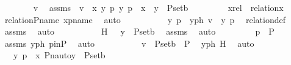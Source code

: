 \begin{isabellebody}
\ \ \ \ \ \ \isamarkupfalse%
\ v\ \isamarkupfalse%
\ assms\ {\isacharcolon}{\kern0pt}\ {\isachardoublequoteopen}v\ {\isasymin}\ x{\isachardoublequoteclose}\ {\isachardoublequoteopen}{\isacharparenleft}{\kern0pt}{\isasymAnd}y\ p{\isachardot}{\kern0pt}\ {\isasymlangle}y{\isacharcomma}{\kern0pt}\ p{\isasymrangle}\ {\isasymin}\ x\ {\isasymLongrightarrow}\ y\ {\isasymin}\ P{\isacharunderscore}{\kern0pt}set{\isacharparenleft}{\kern0pt}b{\isacharparenright}{\kern0pt}{\isacharparenright}{\kern0pt}{\isachardoublequoteclose}\ \isanewline
\ \ \ \ \ \ \isamarkupfalse%
\ xrel\ {\isacharcolon}{\kern0pt}\ {\isachardoublequoteopen}relation{\isacharparenleft}{\kern0pt}x{\isacharparenright}{\kern0pt}{\isachardoublequoteclose}\ \isamarkupfalse%
\ relation{\isacharunderscore}{\kern0pt}P{\isacharunderscore}{\kern0pt}name\ xpname\ \isamarkupfalse%
\ auto\ \isanewline
\ \ \ \ \ \ \isamarkupfalse%
\ \isamarkupfalse%
\ y\ p\ \ yph{\isacharcolon}{\kern0pt}\ {\isachardoublequoteopen}v\ {\isacharequal}{\kern0pt}\ {\isacharless}{\kern0pt}y{\isacharcomma}{\kern0pt}\ p{\isachargreater}{\kern0pt}{\isachardoublequoteclose}\ \isamarkupfalse%
\ relation{\isacharunderscore}{\kern0pt}def\ \isamarkupfalse%
\ assms\ \isamarkupfalse%
\ auto\ \isanewline
\ \ \ \ \ \ \isamarkupfalse%
\ \isamarkupfalse%
\ H\ {\isacharcolon}{\kern0pt}\ {\isachardoublequoteopen}\ y\ {\isasymin}\ P{\isacharunderscore}{\kern0pt}set{\isacharparenleft}{\kern0pt}b{\isacharparenright}{\kern0pt}{\isachardoublequoteclose}\ \isamarkupfalse%
\ assms\ \isamarkupfalse%
\ auto\ \isanewline
\ \ \ \ \ \ \isamarkupfalse%
\ {\isachardoublequoteopen}p\ {\isasymin}\ P{\isachardoublequoteclose}\ \isamarkupfalse%
\ assms\ yph\ pinP\ \isamarkupfalse%
\ auto\ \isanewline
\ \ \ \ \ \ \isamarkupfalse%
\ \isamarkupfalse%
\ {\isachardoublequoteopen}v\ {\isasymin}\ P{\isacharunderscore}{\kern0pt}set{\isacharparenleft}{\kern0pt}b{\isacharparenright}{\kern0pt}\ {\isasymtimes}\ P{\isachardoublequoteclose}\ \isamarkupfalse%
\ yph\ H\ \isamarkupfalse%
\ auto\ \isanewline
\ \ \ \ \isamarkupfalse%
\isanewline
\ \ \ \ \isamarkupfalse%
\ \isamarkupfalse%
\ {\isachardoublequoteopen}{\isachardot}{\kern0pt}{\isachardot}{\kern0pt}{\isachardot}{\kern0pt}\ {\isasymlongleftrightarrow}\ {\isacharparenleft}{\kern0pt}{\isasymforall}{\isacharless}{\kern0pt}y{\isacharcomma}{\kern0pt}\ p{\isachargreater}{\kern0pt}\ {\isasymin}\ x{\isachardot}{\kern0pt}\ Pn{\isacharunderscore}{\kern0pt}auto{\isacharparenleft}{\kern0pt}{\isasympi}{\isacharparenright}{\kern0pt}{\isacharbackquote}{\kern0pt}y\ {\isasymin}\ P{\isacharunderscore}{\kern0pt}set{\isacharparenleft}{\kern0pt}b{\isacharparenright}{\kern0pt}{\isacharparenright}{\kern0pt}{\isachardoublequoteclose}\ \isanewline

\end{isabellebody}
